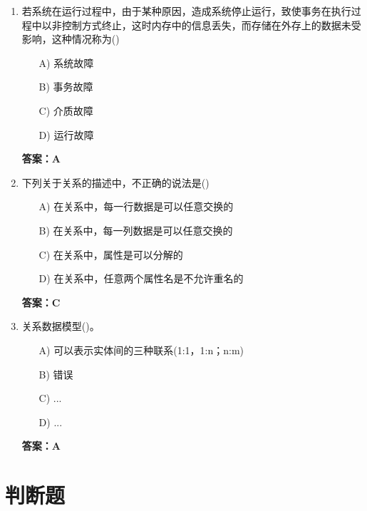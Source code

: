 \documentclass[a4paper,12pt]{article}
\begin{document}
\begin{enumerate}[label=\arabic*.]
\item 若系统在运行过程中，由于某种原因，造成系统停止运行，致使事务在执行过程中以非控制方式终止，这时内存中的信息丢失，而存储在外存上的数据未受影响，这种情况称为()
\begin{itemize}
    \item[A)] 系统故障
    \item[B)] 事务故障
    \item[C)] 介质故障
    \item[D)] 运行故障
\end{itemize}
\textbf{答案：A}

\item 下列关于关系的描述中，不正确的说法是()
\begin{itemize}
    \item[A)] 在关系中，每一行数据是可以任意交换的
    \item[B)] 在关系中，每一列数据是可以任意交换的
    \item[C)] 在关系中，属性是可以分解的
    \item[D)] 在关系中，任意两个属性名是不允许重名的
\end{itemize}
\textbf{答案：C}

\item 关系数据模型()。
\begin{itemize}
    \item[A)] 可以表示实体间的三种联系(1:1，1:n；n:m)
    \item[B)] 错误
    \item[C)] ...
    \item[D)] ...
\end{itemize}
\textbf{答案：A}

\end{enumerate}

\section{判断题}
\end{document}
